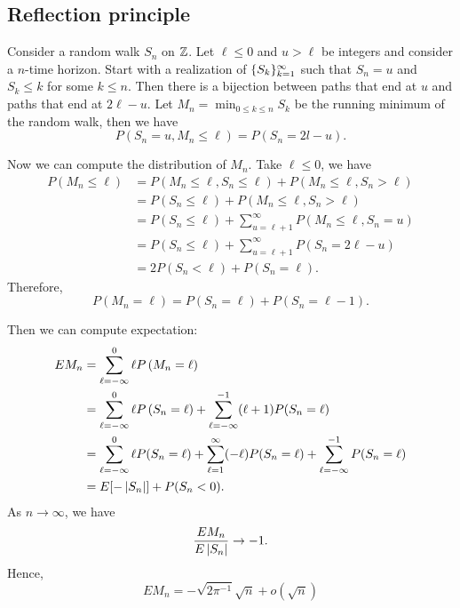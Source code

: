 \documentclass[a4paper]{article}
\begin{document}
\subsection{Reflection principle}
Consider a random walk $S_n$ on $\mathbb{Z}$.
Let $\ell \leq 0$ and $u > \ell$ be integers and consider a $n$-time horizon. 
Start with a realization of 
$\{ S_k \}_{k=1}^\infty$ such that $S_n = u$ and $S_k \leq k$ for some 
$k \leq n$. Then there is a bijection between paths that end at $u$ 
and paths that end at $2 \ell - u$. Let $M_n = \min_{0 \leq k \leq n} S_k$
be the running minimum of the random walk, then we have 
\[
P \left( S_n = u, M_n \leq \ell \right)
= P (S_n = 2l - u).
\]

\begin{eg}
  Now we can compute the distribution of $M_n$. 
  Take $\ell \leq 0$, we have 
  \begin{align*}
    P \left( M_n \leq \ell \right) 
    &= P \left( M_n \leq \ell, S_n \leq \ell \right)  
    + P \left( M_n \leq \ell , S_n > \ell \right) \\
    &= P \left( S_n \leq \ell \right)  
    + P \left( M_n \leq \ell , S_n > \ell \right) \\
    &= P ( S_n \leq \ell ) 
    + \sum_{u = \ell + 1}^\infty P \left( M_n \leq \ell , S_n = u \right) \\
    &= P ( S_n \leq \ell ) + \sum_{u = \ell + 1}^\infty P (S_n = 2 \ell - u) \\
    &= 2 P ( S_n < \ell ) + P (S_n = \ell).
  \end{align*}
  Therefore, 
  \[
  P \left( M_n = \ell \right) = P(S_n = \ell) + P(S_n = \ell - 1).
  \]

  Then we can compute expectation:
  \begin{align*}
    E M_n 
    &= \sum_{\ell = - \infty}^0 \ell P \left( M_n = \ell \right) \\ 
    &= \sum_{\ell = - \infty}^0 \ell P \left( S_n = \ell \right) 
    + \sum_{\ell = - \infty}^{-1} (\ell + 1) P(S_n = \ell) \\ 
    &= \sum_{\ell = - \infty}^{0} \ell P ( S_n = \ell ) 
    + \sum_{\ell = 1}^\infty (- \ell) P( S_n = \ell )
    + \sum_{\ell = - \infty}^{-1} P(S_n = \ell) \\
    &= E [- \left\lvert S_n\right\rvert] + P (S_n < 0).
  \end{align*}
  As $n \to \infty$, we have 
  \[
  \frac{E M_n}{E \left\lvert S_n\right\rvert} \to -1.
  \]
  Hence, 
  \[
  E M_n = - \sqrt{2 \pi^{-1}} \sqrt{n} + o( \sqrt{n} )
  \]
\end{eg}
\end{document}

